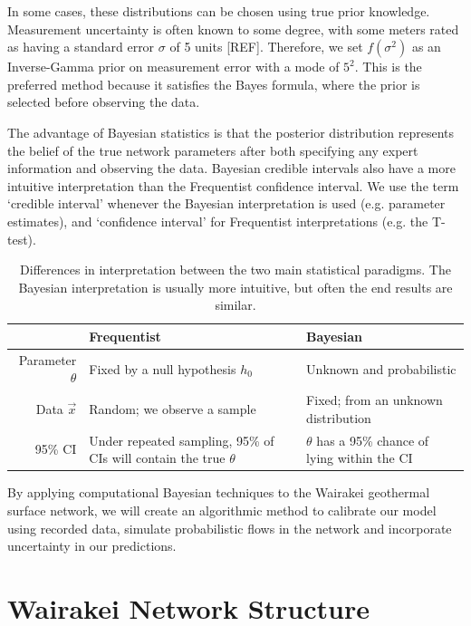 \documentclass[a4paper, 12pt]{article}
\begin{document}
In some cases, these distributions can be chosen using true prior knowledge. Measurement uncertainty is often known to some degree, with some meters rated as having a standard error $\sigma$ of 5 units [REF]. Therefore, we set $f(\sigma^2)$ as an Inverse-Gamma prior on measurement error with a mode of $5^2$. This is the preferred method because it satisfies the Bayes formula, where the prior is selected before observing the data.

The advantage of Bayesian statistics is that the posterior distribution represents the belief of the true network parameters after both specifying any expert information and observing the data. Bayesian credible intervals also have a more intuitive interpretation than the Frequentist confidence interval. We use the term `credible interval' whenever the Bayesian interpretation is used (e.g. parameter estimates), and `confidence interval' for Frequentist interpretations (e.g. the T-test).

\begin{table}[ht]
\centering
\begin{tabularx}{\linewidth}{rXX}
\hline
 & Frequentist & Bayesian \\ 
  \hline
Parameter $\theta$ & Fixed by a null hypothesis $h_0$ & Unknown and probabilistic \\\hline
Data $\vec{x}$ & Random; we observe a sample & Fixed; from an unknown distribution \\\hline
95\% CI & Under repeated sampling, 95\% of CIs will contain the true $\theta$ & $\theta$ has a 95\% chance of lying within the CI  \\
   \hline
\end{tabularx}
\caption{Differences in interpretation between the two main statistical paradigms. The Bayesian interpretation is usually more intuitive, but often the end results are similar.}
\label{tab:ci}
\end{table}

By applying computational Bayesian techniques to the Wairakei geothermal surface network, we will create an algorithmic method to calibrate our model using recorded data, simulate probabilistic flows in the network and incorporate uncertainty in our predictions.

\section{Wairakei Network Structure}
\end{document}
